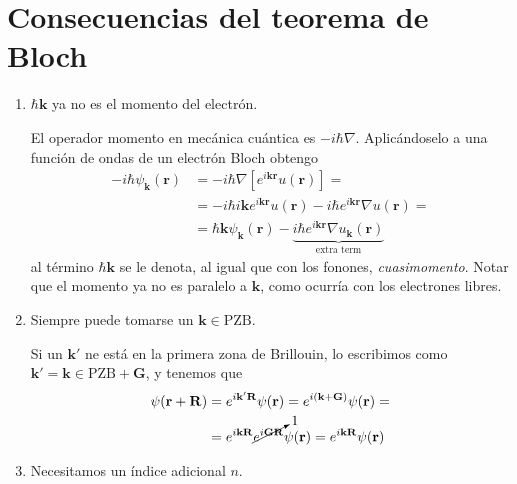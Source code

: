 \section{Consecuencias del teorema de Bloch}
\begin{enumerate}
\item $\hbar \mathbf{k}$ ya no es el momento del electrón.

El operador momento en mecánica cuántica es $-i \hbar
\nabla$. Aplicándoselo a una función de ondas de un electrón Bloch
obtengo
\begin{equation}
\begin{split}
  -i \hbar \psi_\mathbf{k}(\mathbf{r}) &= -i \hbar \nabla
\left[ e^{i \mathbf{k} \mathbf{r}} {u} (\mathbf{r}) \right] = \\ &= -i
\hbar i \mathbf{k} e^{i \mathbf{k} \mathbf{r}} {u}(\mathbf{r}) - i
\hbar e^{i \mathbf{k}\mathbf{r}} \nabla {u}(\mathbf{r}) = \\ &= \hbar
\mathbf{k} \psi_\mathbf{k}(\mathbf{r}) - \underbrace{i \hbar e^{i
\mathbf{k}\mathbf{r}} \nabla {u}_\mathbf{k}(\mathbf{r})}_{\text{extra
term}}
\end{split}
\end{equation}
al término $\hbar \mathbf{k}$ se le denota, al igual que con los
fonones, \emph{cuasimomento}. Notar que el momento ya no es paralelo a
$\mathbf{k}$, como ocurría con los electrones libres.
\item Siempre puede tomarse un $\mathbf{k}\in \text{PZB}$.

Si un $\mathbf{k'}$ ne está en la primera zona de Brillouin, lo
escribimos como $\mathbf{k'} = \mathbf{k}\in \text{PZB} +
\mathbf{G}$, y tenemos que
\begin{equation}
\begin{split}
  \psi(\mathbf{r}+\mathbf{R}) &= e^{i \mathbf{k'} \mathbf{R}}
  \psi(\mathbf{r}) = e^{i(\mathbf{k}+\mathbf{G})}\psi(\mathbf{r}) =
  \\ &=
  e^{i \mathbf{k} \mathbf{R}} \cancelto{1}{e^{i \mathbf{G}
      \mathbf{R}}} \psi(\mathbf{r}) = e^{i \mathbf{k} \mathbf{R}} \psi(\mathbf{r})
\end{split}
\end{equation}
\item Necesitamos un índice adicional $n$.


\end{enumerate}

